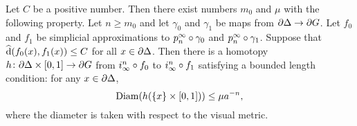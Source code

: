 \documentclass[a4paper]{article}
\begin{document}
\begin{proposition}\label{prop:basic_homotopies}
  Let $C$ be a positive number. Then there exist numbers $m_0$ and $\mu$
  with the following property. Let $n \geq m_0$ and let $\gamma_0$ and
  $\gamma_1$ be maps from $\partial\Delta\to\partial G$. Let $f_0$ and $f_1$
  be simplicial approximations to $p^\infty_n\circ \gamma_0$ and
  $p^\infty_n\circ\gamma_1$. Suppose that $\operatorname{\widehat{d}}(f_0(x), f_1(x))\leq C$
  for all $x \in \partial \Delta$. Then there is a homotopy
  $h\colon\partial\Delta\times[0,1]\to\partial G$ from $i^n_\infty\circ
  f_0$ to $i^n_\infty\circ f_1$ satisfying a bounded length condition: for
  any $x \in \partial\Delta$,
  \begin{equation*}
    \operatorname{Diam}(h(\{x\} \times [0,1])) \leq \mu a^{-n},
  \end{equation*}
  where the diameter is taken with respect to the visual metric.
\end{proposition}
\end{document}
